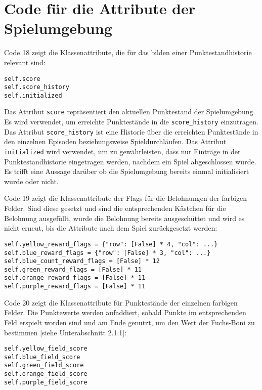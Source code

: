 \section{Code für die Attribute der Spielumgebung}
\begin{minipage}{\linewidth}
Code 18 zeigt die Klassenattribute, die für das bilden einer Punktestandhistorie relevant sind:
\vspace{0.5cm}
\begin{lstlisting}[caption={Klassenattribute für die Nachvollziehbarkeit von Punkteständen}, basicstyle=\ttfamily]
self.score
self.score_history
self.initialized
\end{lstlisting}
\end{minipage}

Das Attribut \texttt{score} repräsentiert den aktuellen Punktestand der Spielumgebung. Es wird verwendet, um erreichte Punktestände in die \texttt{score\_history} einzutragen. Das Attribut \texttt{score\_history} ist eine Historie über die erreichten Punktestände in den einzelnen Episoden beziehungsweise Spieldurchläufen. Das Attribut \texttt{initialized} wird verwendet, um zu gewährleisten, dass nur Einträge in der Punktestandhistorie eingetragen werden, nachdem ein Spiel abgeschlossen wurde. Es trifft eine Aussage darüber ob die Spielumgebung bereits einmal initialisiert wurde oder nicht.\\

\begin{minipage}{\linewidth}
Code 19 zeigt die Klassenattribute der Flags für die Belohnungen der farbigen Felder. Sind diese gesetzt und sind die entsprechenden Kästchen für die Belohnung ausgefüllt, wurde die Belohnung bereits ausgeschüttet und wird es nicht erneut, bis die Attribute nach dem Spiel zurückgesetzt werden:
\vspace{0.5cm}
\begin{lstlisting}[caption={Klassenattribute für Belohnungsflags}, basicstyle=\ttfamily]
self.yellow_reward_flags = {"row": [False] * 4, "col": ...}
self.blue_reward_flags = {"row": [False] * 3, "col": ...}
self.blue_count_reward_flags = [False] * 12
self.green_reward_flags = [False] * 11
self.orange_reward_flags = [False] * 11
self.purple_reward_flags = [False] * 11
\end{lstlisting}
\end{minipage}

\begin{minipage}{\linewidth}
Code 20 zeigt die Klassenattribute für Punktestände der einzelnen farbigen Felder. Die Punktewerte werden aufaddiert, sobald Punkte im entsprechenden Feld erspielt worden sind und am Ende genutzt, um den Wert der Fuchs-Boni zu bestimmen [siehe Unterabschnitt 2.1.1]:
\vspace{0.5cm}
\begin{lstlisting}[caption={Klassenattribute für erreichte Punktestände der einzelnen farbigen Felder}, basicstyle=\ttfamily]
self.yellow_field_score
self.blue_field_score
self.green_field_score
self.orange_field_score
self.purple_field_score
\end{lstlisting}
\end{minipage}

